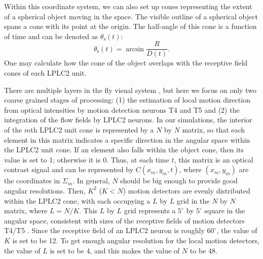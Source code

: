 \documentclass[pdftex,9pt,lineno]{elife}
\begin{document}
Within this coordinate system, we can also set up cones representing the extent of a spherical object moving in the space. The visible outline of a spherical object spans a cone with its point at the origin. The half-angle of this cone is a function of time and can be denoted as $\theta_{\text{s}}(t)$:
\begin{equation}
\theta_{\text{s}}(t) = \arcsin{\frac{R}{D(t)}}.
\end{equation}
One may calculate how the cone of the object overlaps with the receptive field cones of each LPLC2 unit.

There are multiple layers in the fly visual system \citep{takemura2017comprehensive}, but here we focus on only two coarse grained stages of processing: (1) the estimation of local motion direction from optical intensities by motion detection neurons T4 and T5 and (2) the integration of the flow fields by LPLC2 neurons. In our simulations, the interior of the $m$th LPLC2 unit cone is represented by a $N$ by $N$ matrix, so that each element in this matrix indicates a specific direction in the angular space within the LPLC2 unit cone. If an element also falls within the object cone, then its value is set to 1; otherwise it is 0. Thus, at each time $t$, this matrix is an optical contrast signal and can be represented by $C(x_{m},y_{m},t)$, where $(x_{m},y_{m})$ are the coordinates in $\Sigma_{m}$. In general, $N$ should be big enough to provide good angular resolutions. Then, $K^{2}$ ($K<N$) motion detectors are evenly distributed within the LPLC2 cone, with each occupying a $L$ by $L$ grid in the $N$ by $N$ matrix, where $L=N/K$. This $L$ by $L$ grid represents a $5^{\circ}$ by $5^{\circ}$ square in the angular space, consistent with sizes of the receptive fields of motion detectors T4/T5 \citep{zavatone2020minimal}. Since the receptive field of an LPLC2 neuron is roughly $60^{\circ}$, the value of $K$ is set to be 12. To get enough angular resolution for the local motion detectors, the value of $L$ is set to be 4, and this makes the value of $N$ to be 48.
\end{document}
